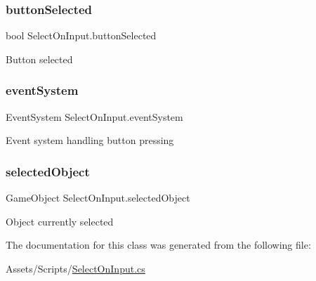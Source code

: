 \subsubsection{\texorpdfstring{buttonSelected}{buttonSelected}}
{\footnotesize\ttfamily bool Select\+On\+Input.\+button\+Selected\hspace{0.3cm}{\ttfamily [private]}}

Button selected \mbox{\label{class_select_on_input_adf9cd7303f57e21b83a1d7f537158cc0}} 
\subsubsection{\texorpdfstring{eventSystem}{eventSystem}}
{\footnotesize\ttfamily Event\+System Select\+On\+Input.\+event\+System}

Event system handling button pressing \mbox{\label{class_select_on_input_a7c45b36a1cf3101337a96d6a2c18ff5c}} 
\subsubsection{\texorpdfstring{selectedObject}{selectedObject}}
{\footnotesize\ttfamily Game\+Object Select\+On\+Input.\+selected\+Object}

Object currently selected 

The documentation for this class was generated from the following file\+:\begin{DoxyCompactItemize}
\item 
Assets/\+Scripts/\mbox{\hyperlink{_select_on_input_8cs}{Select\+On\+Input.\+cs}}\end{DoxyCompactItemize}
